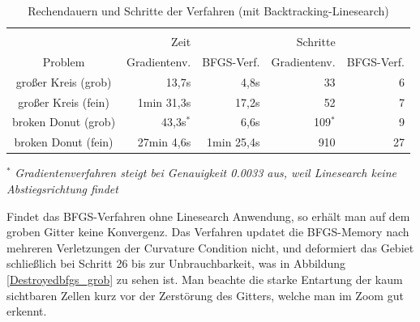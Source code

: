 \begin{table}[h]
\label{Tabelle}
\centering
\begin{tabular}{c rrrr}
\hline\\[-2.5ex]
 & \hspace{1cm} Zeit & & \hspace{1cm} Schritte \\
Problem &Gradientenv. &BFGS-Verf. &Gradientenv. &BFGS-Verf.  \\[0.2ex]

\hline \hline 
großer Kreis (grob) & 13,7s      & 4,8s       & 33      & 6 \\
großer Kreis (fein) & 1min 31,3s & 17,2s      & 52      & 7 \\
broken Donut (grob) & 43,3s$^*$  & 6,6s       & 109$^*$ & 9 \\
broken Donut (fein) & 27min 4,6s & 1min 25,4s & 910     & 27 \\
\hline
\end{tabular} 

\vspace{0.2cm}$^*$ \textit{Gradientenverfahren steigt bei Genauigkeit 0.0033 aus, weil \newline \hspace{-3.2cm}Linesearch keine Abstiegsrichtung findet}
 
 \caption{Rechendauern und Schritte der Verfahren (mit Backtracking-Linesearch)}

\end{table}


Findet das BFGS-Verfahren ohne Linesearch Anwendung, so erhält man auf dem groben Gitter keine Konvergenz. Das Verfahren updatet die BFGS-Memory nach mehreren Verletzungen der Curvature Condition nicht, und deformiert das Gebiet schließlich bei Schritt 26 bis zur Unbrauchbarkeit, was in Abbildung \ref{Destroyedbfgs_grob} zu sehen ist. Man beachte die starke Entartung der kaum sichtbaren Zellen kurz vor der Zerstörung des Gitters, welche man im Zoom gut erkennt.



